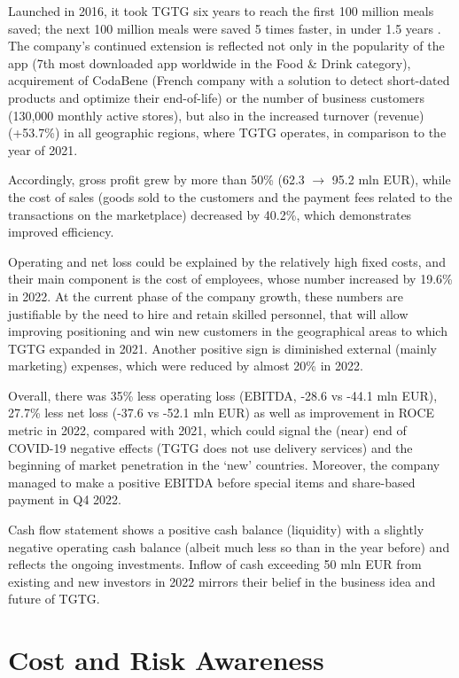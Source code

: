 \documentclass{article}
\begin{document}
Launched in 2016, it took TGTG six years to reach the first 100 million meals
saved; the next 100 million meals were saved 5 times faster, in under 1.5 years
\cite{milestones}. The company’s continued extension is reflected not only in
the popularity of the app (7th most downloaded app worldwide in the Food \&
Drink category), acquirement of CodaBene (French company with a solution to
detect short-dated products and optimize their end-of-life) or the number of
business customers (130,000 monthly active stores), but also in the increased
turnover (revenue) (+53.7\%) in all geographic regions, where TGTG operates, in
comparison to the year of 2021. 

Accordingly, gross profit grew by more than 50\% (62.3 $\rightarrow$ 95.2 mln EUR), while
the cost of sales (goods sold to the customers and the payment fees related to
the transactions on the marketplace) decreased by 40.2\%, which demonstrates
improved efficiency.

Operating and net loss could be explained by the relatively high fixed costs,
and their main component is the cost of employees, whose number increased by
19.6\% in 2022. At the current phase of the company growth, these numbers are
justifiable by the need to hire and retain skilled personnel, that will allow
improving positioning and win new customers in the geographical areas to which
TGTG expanded in 2021. Another positive sign is diminished external (mainly
marketing) expenses, which were reduced by almost 20\% in 2022.

Overall, there was 35\% less operating loss (EBITDA, -28.6 vs -44.1 mln EUR),
27.7\% less net loss (-37.6 vs -52.1 mln EUR) as well as improvement in ROCE
metric in 2022, compared with 2021, which could signal the (near) end of
COVID-19 negative effects (TGTG does not use delivery services) and the
beginning of market penetration in the ‘new’ countries. Moreover, the company
managed to make a positive EBITDA before special items and share-based payment
in Q4 2022.

Cash flow statement shows a positive cash balance (liquidity) with a slightly
negative operating cash balance (albeit much less so than in the year before)
and reflects the ongoing investments. Inflow of cash exceeding 50 mln EUR from
existing and new investors in 2022 mirrors their belief in the business idea
and future of TGTG.

\section{Cost and Risk Awareness}
\end{document}
